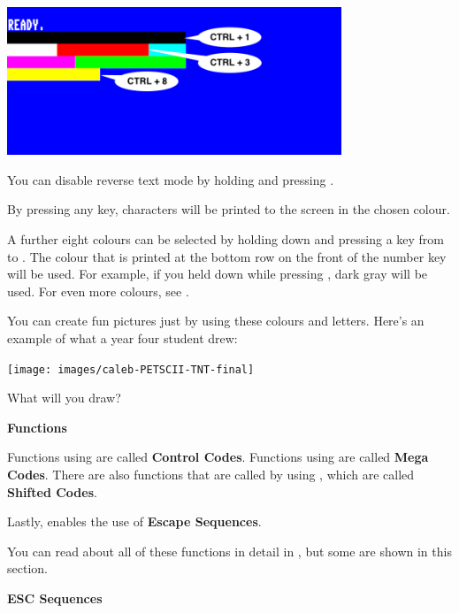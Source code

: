 \begin{center}
\includegraphics[width={10cm}]{images/introduction-screen/colour-bars.png}
\end{center}


You can disable reverse text mode by holding  and pressing .

By pressing any key, characters will be printed to the screen in the chosen colour.

A further eight colours can be selected by holding down \megasymbolkey and pressing a key from  to .
The colour that is printed at the bottom row on the front of the number key will be used. For example, if you held
\megasymbolkey down while pressing , dark gray will be used. For even more colours, see .

\needspace{4cm}
You can create fun pictures just by using these colours and letters.  Here's an example of what a year four student drew:

\begin{center}
\texttt{[image: images/caleb-PETSCII-TNT-final]}
\end{center}

What will you draw?

\needspace{2cm}
\textbf{Functions}

Functions using  are called \textbf{Control Codes}.
Functions using \megasymbolkey are called \textbf{Mega Codes}. There are also functions that are called by using , which
are called \textbf{Shifted Codes}.

Lastly,  enables the use of \textbf{Escape Sequences}.

You can read about all of these functions in detail in , but some are shown in this section.


\needspace{2cm}
\textbf{ESC Sequences}


